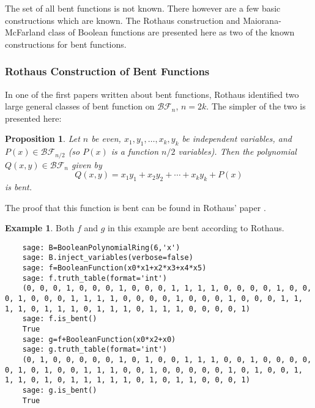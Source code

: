 \documentclass[english]{article}
\def\BF{\mathcal{BF}}
\theoremstyle{plain}
\newtheorem{proposition}[theorem]{Proposition}%
\theoremstyle{definition}
\newtheorem{example}[theorem]{Example}
\theoremstyle{remark}
\begin{document}

\par The set of all bent functions is not known. There however are a few basic
constructions which are known. The Rothaus construction and Maiorana-McFarland class of Boolean
functions are presented here as two of the known constructions for bent
functions.

\subsubsection{Rothaus Construction of Bent Functions}
\par In one of the first papers written about bent functions, Rothaus identified
two large general classes of bent function on $\BF_n$, $n=2k$. The simpler of
the two is presented here:
\begin{proposition}
  Let $n$ be even, $x_1,y_1,\dots,x_k,y_k$ be independent variables, and
  $P(x)\in\BF_{n/2}$ (so $P(x)$ is a function $n/2$ variables). Then the polynomial
  $Q(x,y)\in\BF_{n}$ given by
  \begin{equation}
    Q(x,y)=x_1y_1+x_2y_2+\cdots+x_ky_k+P(x)
  \end{equation}
  is bent.
\end{proposition}
\par The proof that this function is bent can be found in Rothaus' paper
\cite{art:r76}.

\begin{example}
  \par Both $f$ and $g$ in this example are bent according to Rothaus.
  \begin{lstlisting}
    sage: B=BooleanPolynomialRing(6,'x')
    sage: B.inject_variables(verbose=false)
    sage: f=BooleanFunction(x0*x1+x2*x3+x4*x5)
    sage: f.truth_table(format='int')
    (0, 0, 0, 1, 0, 0, 0, 1, 0, 0, 0, 1, 1, 1, 1, 0, 0, 0, 0, 1, 0, 0, 0, 1, 0, 0, 0, 1, 1, 1, 1, 0, 0, 0, 0, 1, 0, 0, 0, 1, 0, 0, 0, 1, 1, 1, 1, 0, 1, 1, 1, 0, 1, 1, 1, 0, 1, 1, 1, 0, 0, 0, 0, 1)
    sage: f.is_bent()
    True
    sage: g=f+BooleanFunction(x0*x2+x0)
    sage: g.truth_table(format='int')
    (0, 1, 0, 0, 0, 0, 0, 1, 0, 1, 0, 0, 1, 1, 1, 0, 0, 1, 0, 0, 0, 0, 0, 1, 0, 1, 0, 0, 1, 1, 1, 0, 0, 1, 0, 0, 0, 0, 0, 1, 0, 1, 0, 0, 1, 1, 1, 0, 1, 0, 1, 1, 1, 1, 1, 0, 1, 0, 1, 1, 0, 0, 0, 1)
    sage: g.is_bent()
    True
  \end{lstlisting}
\end{example}
\end{document}
